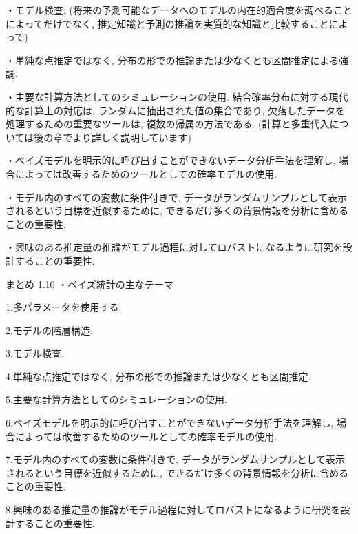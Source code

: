\documentclass[10pt,dvipdfmx,a4]{beamer}
\begin{document}

\begin{frame}
・モデル検査.
(将来の予測可能なデータへのモデルの内在的適合度を調べることによってだけでなく, 推定知識と予測の推論を実質的な知識と比較することによって)

・単純な点推定ではなく, 分布の形での推論または少なくとも区間推定による強調.

・主要な計算方法としてのシミュレーションの使用.
結合確率分布に対する現代的な計算上の対応は, ランダムに抽出された値の集合であり, 欠落したデータを処理するための重要なツールは, 複数の帰属の方法である.
(計算と多重代入については後の章でより詳しく説明しています)

・ベイズモデルを明示的に呼び出すことができないデータ分析手法を理解し, 場合によっては改善するためのツールとしての確率モデルの使用.

・モデル内のすべての変数に条件付きで, データがランダムサンプルとして表示されるという目標を近似するために, できるだけ多くの背景情報を分析に含めることの重要性.

・興味のある推定量の推論がモデル過程に対してロバストになるように研究を設計することの重要性.
\end{frame}


\begin{frame}{まとめ 1.10}
・ベイズ統計の主なテーマ

1.多パラメータを使用する.

2.モデルの階層構造.

3.モデル検査.

4.単純な点推定ではなく, 分布の形での推論または少なくとも区間推定.

5.主要な計算方法としてのシミュレーションの使用.

6.ベイズモデルを明示的に呼び出すことができないデータ分析手法を理解し, 場合によっては改善するためのツールとしての確率モデルの使用.

7.モデル内のすべての変数に条件付きで, データがランダムサンプルとして表示されるという目標を近似するために, できるだけ多くの背景情報を分析に含めることの重要性.

8.興味のある推定量の推論がモデル過程に対してロバストになるように研究を設計することの重要性.
\end{frame}
\end{document}
